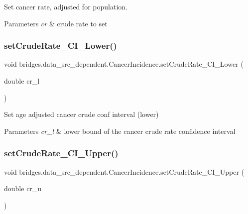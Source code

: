 Set cancer rate, adjusted for population. 


\begin{DoxyParams}{Parameters}
{\em cr} & crude rate to set \\
\hline
\end{DoxyParams}
\mbox{\label{classbridges_1_1data__src__dependent_1_1_cancer_incidence_a72e3960af58f32d26e32f49ada2f1555}} 
\subsubsection{\texorpdfstring{setCrudeRate\_CI\_Lower()}{setCrudeRate\_CI\_Lower()}}
{\footnotesize\ttfamily void bridges.\+data\+\_\+src\+\_\+dependent.\+Cancer\+Incidence.\+set\+Crude\+Rate\+\_\+\+C\+I\+\_\+\+Lower (\begin{DoxyParamCaption}\item[{double}]{cr\+\_\+l }\end{DoxyParamCaption})}



Set age adjusted cancer crude conf interval (lower) 


\begin{DoxyParams}{Parameters}
{\em cr\+\_\+l} & lower bound of the cancer crude rate confidence interval \\
\hline
\end{DoxyParams}
\mbox{\label{classbridges_1_1data__src__dependent_1_1_cancer_incidence_a99e25dd53093badf350b06b7e0c8b725}} 
\subsubsection{\texorpdfstring{setCrudeRate\_CI\_Upper()}{setCrudeRate\_CI\_Upper()}}
{\footnotesize\ttfamily void bridges.\+data\+\_\+src\+\_\+dependent.\+Cancer\+Incidence.\+set\+Crude\+Rate\+\_\+\+C\+I\+\_\+\+Upper (\begin{DoxyParamCaption}\item[{double}]{cr\+\_\+u }\end{DoxyParamCaption})}



